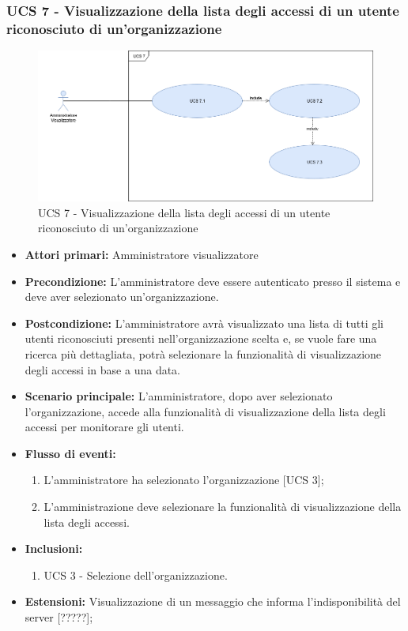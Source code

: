 \newpage

\subsubsection{UCS 7 - Visualizzazione della lista degli accessi di un utente riconosciuto di un'organizzazione}

\begin{figure}[h]
	\centering
	\includegraphics[scale=0.3]{sezioni/UseCase/Immagini/UCS7.png}
	\caption{UCS 7 - Visualizzazione della lista degli accessi di un utente riconosciuto di un'organizzazione}
\end{figure}

\begin{itemize}
\item \textbf{Attori primari:} Amministratore visualizzatore
\item \textbf{Precondizione:} L'amministratore deve essere autenticato presso il sistema e deve aver selezionato un'organizzazione.
\item \textbf{Postcondizione:} L'amministratore avrà visualizzato una lista di tutti gli utenti riconosciuti presenti nell'organizzazione scelta e, se vuole fare una ricerca più dettagliata, potrà selezionare la funzionalità di visualizzazione degli accessi in base a una data.
\item \textbf{Scenario principale:} L'amministratore, dopo aver selezionato l'organizzazione, accede alla funzionalità di visualizzazione della lista degli accessi per monitorare gli utenti.
\item \textbf{Flusso di eventi:} 
\begin{enumerate}
	\item L'amministratore ha selezionato l'organizzazione [UCS 3];
	\item L'amministrazione deve selezionare la funzionalità di visualizzazione della lista degli accessi.
\end{enumerate}
\item \textbf{Inclusioni:}
\begin{enumerate}
	\item UCS 3 - Selezione dell'organizzazione.
\end{enumerate}
\item \textbf{Estensioni:} Visualizzazione di un messaggio che informa l'indisponibilità del server [?????];
\end{itemize}

